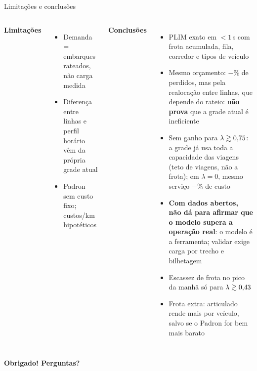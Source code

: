 \documentclass[aspectratio=169,11pt]{beamer}
\newcommand{\destaque}[1]{{\color{azul}\textbf{#1}}}
\begin{document}
\begin{frame}{Limitações e conclusões}
\begin{columns}[T]
\textbf{Limitações}
\begin{itemize}\small
\item Demanda = embarques rateados, não carga medida
\item Diferença entre linhas e perfil horário vêm da própria grade atual
\item Padron sem custo fixo; custos/km hipotéticos
\end{itemize}
\textbf{Conclusões}
\begin{itemize}\footnotesize
\item PLIM exato em $<1$\,s com frota acumulada, fila, corredor e tipos de veículo
\item Mesmo orçamento: $-$\moReducaoPerda\% de perdidos, mas pela realocação entre linhas, que depende do rateio: \destaque{não prova} que a grade atual é ineficiente
\item Sem ganho para $\lambda\gtrsim0{,}75$: a grade já usa toda a capacidade das \viagensGTFS{} viagens (teto de viagens, não a frota); em $\lambda=0$, mesmo serviço $-$\moEconomiaLambdaZero\% de custo
\item \destaque{Com dados abertos, não dá para afirmar que o modelo supera a operação real}: o modelo é a ferramenta; validar exige carga por trecho e bilhetagem
\item Escassez de frota no pico da manhã só para $\lambda\gtrsim0{,}43$
\item Frota extra: articulado rende mais por veículo, salvo se o Padron for bem mais barato
\end{itemize}
\end{columns}
\vspace{0.6em}
\begin{center}\Large\color{marinho}\textbf{Obrigado! Perguntas?}\end{center}
\end{frame}

\appendix
\end{document}

